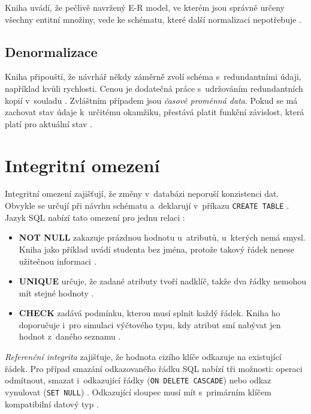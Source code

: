 Kniha uvádí, že pečlivě navržený E-R model, ve kterém jsou správně určeny všechny entitní množiny, vede ke schématu, které další normalizaci nepotřebuje \cite[s.~344]{Silberschatz2020}.

\subsection{Denormalizace}

Kniha připouští, že návrhář někdy záměrně zvolí schéma s~redundantními údaji, například kvůli rychlosti. Cenou je dodatečná práce s~udržováním redundantních kopií v~souladu \cite[s.~346]{Silberschatz2020}. Zvláštním případem jsou \emph{časově proměnná data}. Pokud se má zachovat stav údaje k~určitému okamžiku, přestává platit funkční závislost, která platí pro aktuální stav \cite[s.~347--348]{Silberschatz2020}.

\section{Integritní omezení}\label{sec:principy-omezeni}

Integritní omezení zajišťují, že změny v~databázi neporuší konzistenci dat. Obvykle se určují při návrhu schématu a~deklarují v~příkazu \texttt{CREATE TABLE} \cite[s.~145--146]{Silberschatz2020}. Jazyk SQL nabízí tato omezení pro jednu relaci \cite[s.~146--149]{Silberschatz2020}:
\begin{itemize}
\item \textbf{NOT NULL} zakazuje prázdnou hodnotu u~atributů, u~kterých nemá smysl. Kniha jako příklad uvádí studenta bez jména, protože takový řádek nenese užitečnou informaci \cite[s.~146]{Silberschatz2020}.
\item \textbf{UNIQUE} určuje, že zadané atributy tvoří nadklíč, takže dva řádky nemohou mít stejné hodnoty \cite[s.~147]{Silberschatz2020}.
\item \textbf{CHECK} zadává podmínku, kterou musí splnit každý řádek. Kniha ho doporučuje i~pro simulaci výčtového typu, kdy atribut smí nabývat jen hodnot z~daného seznamu \cite[s.~147--148]{Silberschatz2020}.
\end{itemize}
\emph{Referenční integrita} zajišťuje, že hodnota cizího klíče odkazuje na existující řádek. Pro případ smazání odkazovaného řádku SQL nabízí tři možnosti: operaci odmítnout, smazat i~odkazující řádky (\texttt{ON DELETE CASCADE}) nebo odkaz vynulovat (\texttt{SET NULL}) \cite[s.~149--150]{Silberschatz2020}. Odkazující sloupec musí mít s~primárním klíčem kompatibilní datový typ \cite[s.~149]{Silberschatz2020}.

